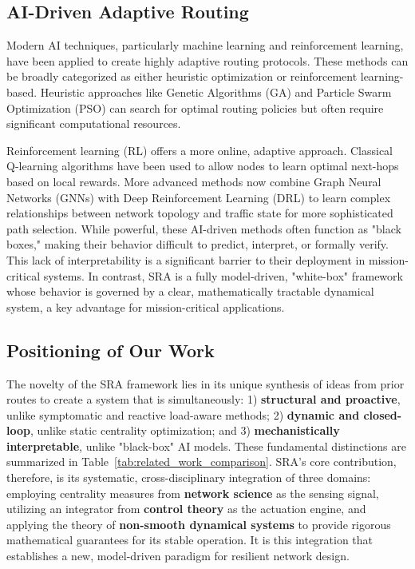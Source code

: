 \documentclass[journal]{IEEEtran}
\begin{document}
\subsection{AI-Driven Adaptive Routing}
Modern AI techniques, particularly machine learning and reinforcement learning, have been applied to create highly adaptive routing protocols. These methods can be broadly categorized as either heuristic optimization or reinforcement learning-based. Heuristic approaches like Genetic Algorithms (GA) \cite{2} and Particle Swarm Optimization (PSO) \cite{10, 16} can search for optimal routing policies but often require significant computational resources.

Reinforcement learning (RL) offers a more online, adaptive approach. Classical Q-learning algorithms \cite{15} have been used to allow nodes to learn optimal next-hops based on local rewards. More advanced methods now combine Graph Neural Networks (GNNs) with Deep Reinforcement Learning (DRL) \cite{3, 5} to learn complex relationships between network topology and traffic state for more sophisticated path selection. While powerful, these AI-driven methods often function as "black boxes," making their behavior difficult to predict, interpret, or formally verify. This lack of interpretability is a significant barrier to their deployment in mission-critical systems. In contrast, SRA is a fully model-driven, "white-box" framework whose behavior is governed by a clear, mathematically tractable dynamical system, a key advantage for mission-critical applications.

\subsection{Positioning of Our Work}
\label{subsec:positioning}



The novelty of the SRA framework lies in its unique synthesis of ideas from prior routes to create a system that is simultaneously: 1) \textbf{structural and proactive}, unlike symptomatic and reactive load-aware methods; 2) \textbf{dynamic and closed-loop}, unlike static centrality optimization; and 3) \textbf{mechanistically interpretable}, unlike "black-box" AI models. These fundamental distinctions are summarized in Table~\ref{tab:related_work_comparison}. SRA's core contribution, therefore, is its systematic, cross-disciplinary integration of three domains: employing centrality measures from \textbf{network science} as the sensing signal, utilizing an integrator from \textbf{control theory} as the actuation engine, and applying the theory of \textbf{non-smooth dynamical systems} to provide rigorous mathematical guarantees for its stable operation. It is this integration that establishes a new, model-driven paradigm for resilient network design.
\end{document}

